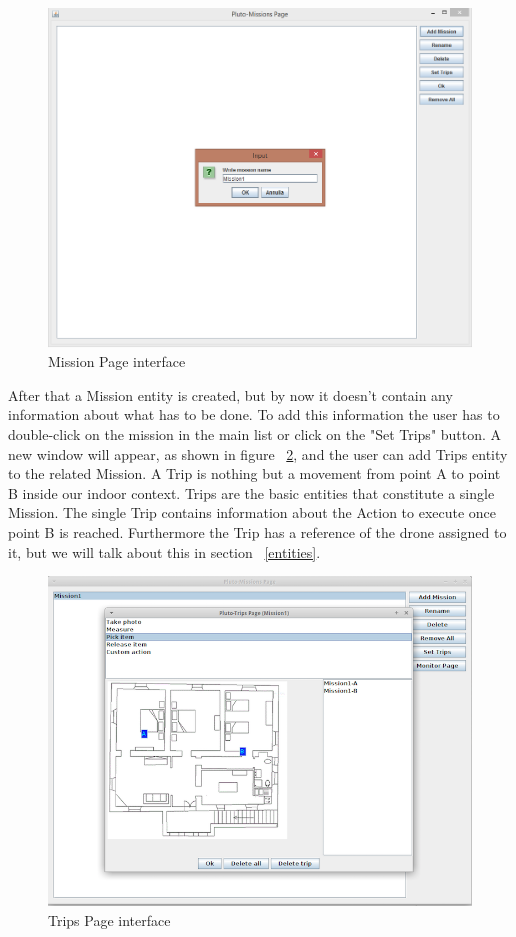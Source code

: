 \begin{figure}[H]
  \centering
  \includegraphics[width=\linewidth]{pictures/MissionPage.png}
  \caption{Mission Page interface}
  \label{fig:MissionPage}
\end{figure}


After that a Mission entity is created, but by now it doesn't contain any information about what has to be done. To add this information the user has to double-click on the mission in the main list or click on the "Set Trips" button. A new window will appear, as shown in figure  ~\ref{fig:TripsPage}, and the user can add Trips entity to the related Mission. A Trip is nothing but a movement from point A to point B inside our indoor context. Trips are the basic entities that constitute a single Mission. The single Trip contains information about the Action to execute once point B is reached. Furthermore the Trip has a reference of the drone assigned to it, but we will talk about this in section ~\ref{entities}.

\begin{figure}[H]
  \centering
  \includegraphics[width=\linewidth]{pictures/TripsPage.png}
  \caption{Trips Page interface}
  \label{fig:TripsPage}
\end{figure}

